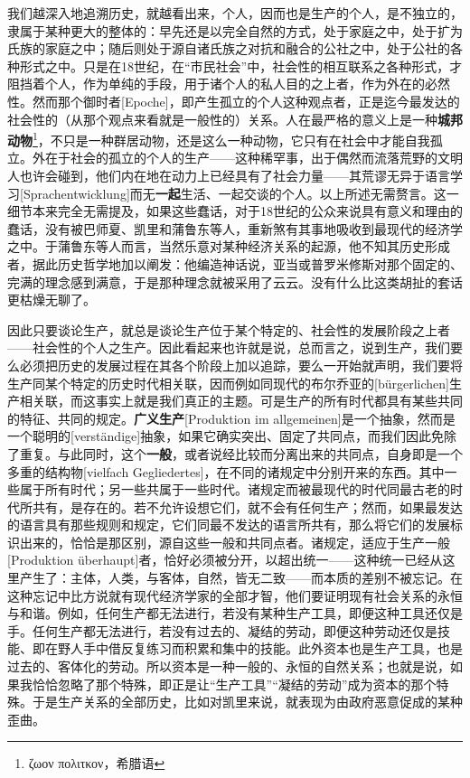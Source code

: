 \documentclass[a5paper,twoside,10.5pt]{ctexart}
\begin{document}
我们越深入地追溯历史，就越看出来，个人，因而也是生产的个人，是不独立的，隶属于某种更大的整体的：早先还是以完全自然的方式，处于家庭之中，处于扩为氏族的家庭之中；随后则处于源自诸氏族之对抗和融合的公社之中，处于公社的各种形式之中。只是在18世纪，在“市民社会”中，社会性的相互联系之各种形式，才阻挡着个人，作为单纯的手段，用于诸个人的私人目的之上者，作为外在的必然性。然而那个御时者[Epoche]，即产生孤立的个人这种观点者，正是迄今最发达的社会性的（从那个观点来看就是一般性的）关系。人在最严格的意义上是一种\textbf{城邦动物}\footnote{ζωον πολιτκον，希腊语}，不只是一种群居动物，还是这么一种动物，它只有在社会中才能自我孤立。外在于社会的孤立的个人的生产——这种稀罕事，出于偶然而流落荒野的文明人也许会碰到，他们内在地在动力上已经具有了社会力量——其荒谬无异于语言学习[Sprachentwicklung]而无\textbf{一起}生活、一起交谈的个人。以上所述无需赘言。这一细节本来完全无需提及，如果这些蠢话，对于18世纪的公众来说具有意义和理由的蠢话，没有被巴师夏、凯里和蒲鲁东等人，重新煞有其事地吸收到最现代的经济学之中。于蒲鲁东等人而言，当然乐意对某种经济关系的起源，他不知其历史形成者，据此历史哲学地加以阐发：他编造神话说，亚当或普罗米修斯对那个固定的、完满的理念感到满意，于是那种理念就被采用了云云。没有什么比这类胡扯的套话更枯燥无聊了。

因此只要谈论生产，就总是谈论生产位于某个特定的、社会性的发展阶段之上者——社会性的个人之生产。因此看起来也许就是说，总而言之，说到生产，我们要么必须把历史的发展过程在其各个阶段上加以追踪，要么一开始就声明，我们要将生产同某个特定的历史时代相关联，因而例如同现代的布尔乔亚的[bürgerlichen]生产相关联，而这事实上就是我们真正的主题。可是生产的所有时代都具有某些共同的特征、共同的规定。\textbf{广义生产}[Produktion im allgemeinen]是一个抽象，然而是一个聪明的[verständige]抽象，如果它确实突出、固定了共同点，而我们因此免除了重复。与此同时，这个\textbf{一般}，或者说经比较而分离出来的共同点，自身即是一个多重的结构物[vielfach Gegliedertes]，在不同的诸规定中分别开来的东西。其中一些属于所有时代；另一些共属于一些时代。诸规定而被最现代的时代同最古老的时代所共有，是存在的。若不允许设想它们，就不会有任何生产；然而，如果最发达的语言具有那些规则和规定，它们同最不发达的语言所共有，那么将它们的发展标识出来的，恰恰是那区别，源自这些一般和共同点者。诸规定，适应于生产一般[Produktion überhaupt]者，恰好必须被分开，以超出统一——这种统一已经从这里产生了：主体，人类，与客体，自然，皆无二致——而本质的差别不被忘记。在这种忘记中比方说就有现代经济学家的全部才智，他们要证明现有社会关系的永恒与和谐。例如，任何生产都无法进行，若没有某种生产工具，即便这种工具还仅是手。任何生产都无法进行，若没有过去的、凝结的劳动，即便这种劳动还仅是技能、即在野人手中借反复练习而积累和集中的技能。此外资本也是生产工具，也是过去的、客体化的劳动。所以资本是一种一般的、永恒的自然关系；也就是说，如果我恰恰忽略了那个特殊，即正是让“生产工具”“凝结的劳动”成为资本的那个特殊。于是生产关系的全部历史，比如对凯里来说，就表现为由政府恶意促成的某种歪曲。
\end{document}

